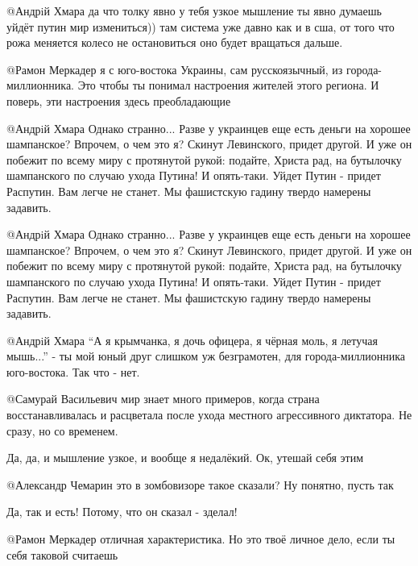 \begin{itemize}
\begin{itemize}
@Андрiй Хмара  да что толку явно у тебя узкое мышление ты явно думаешь уйдёт
путин мир измениться)) там система уже давно как и в сша, от того что рожа
меняется колесо не остановиться оно будет вращаться дальше.


@Рамон Меркадер  я с юго-востока Украины, сам русскоязычный, из
города-миллионника. Это чтобы ты понимал настроения жителей этого региона. И
поверь, эти настроения здесь преобладающие


@Андрiй Хмара  Однако странно... Разве у украинцев еще есть деньги на хорошее
шампанское? Впрочем, о чем это я? Скинут Левинского, придет другой. И уже он
побежит по всему миру с протянутой рукой: подайте, Христа рад, на бутылочку
шампанского по случаю ухода Путина!  И опять-таки. Уйдет Путин - придет
Распутин. Вам легче не станет. Мы фашистскую гадину твердо намерены задавить.


@Андрiй Хмара  Однако странно... Разве у украинцев еще есть деньги на хорошее
шампанское? Впрочем, о чем это я? Скинут Левинского, придет другой. И уже он
побежит по всему миру с протянутой рукой: подайте, Христа рад, на бутылочку
шампанского по случаю ухода Путина!  И опять-таки. Уйдет Путин - придет
Распутин. Вам легче не станет. Мы фашистскую гадину твердо намерены задавить.


@Андрiй Хмара  \enquote{А я крымчанка, я дочь офицера, я чёрная моль, я летучая
мышь...} - ты мой юный друг слишком уж безграмотен, для города-миллионника
юго-востока. Так что - нет.


@Самурай Васильевич  мир знает много примеров, когда страна восстанавливалась
и расцветала после ухода местного агрессивного диктатора. Не сразу, но со
временем.

Да, да, и мышление узкое, и вообще я недалёкий. Ок, утешай себя этим


@Александр Чемарин  это в зомбовизоре такое сказали? Ну понятно, пусть так


Да, так и есть! Потому, что он сказал - зделал!


@Рамон Меркадер  отличная характеристика. Но это твоё личное дело, если ты
себя таковой считаешь


\end{itemize}
\end{itemize}
